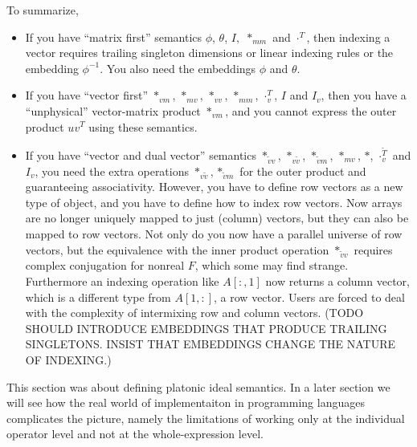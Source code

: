To summarize,
\begin{itemize}
\item If you have ``matrix first'' semantics $\phi$, $\theta$, $I,$
$*_{mm}$ and $\cdot^{T}$, then indexing a vector requires trailing
singleton dimensions or linear indexing rules or the embedding $\phi^{-1}$.
You also need the embeddings $\phi$ and $\theta$.
\item If you have ``vector first'' $*_{vm}$, $*_{mv}$, $*_{vv}$, $*_{mm}$,
$\cdot_{v}^{T}$, $I$ and $I_{v}$, then you have a ``unphysical''
vector-matrix product $*_{vm}$, and you cannot express the outer
product $uv^{T}$ using these semantics.
\item If you have ``vector and dual vector'' semantics $*_{\tilde{v}v}$,
$*_{v\tilde{v}}$, $*_{\tilde{v}m}$, $*_{mv}$, $*$, $\cdot_{v}^{\tilde{T}}$
and $I_{v}$, you need the extra operations $*_{v\tilde{v}},*_{\tilde{v}m}$
for the outer product and guaranteeing associativity. However, you
have to define row vectors as a new type of object, and you have to
define  how to index row vectors. Now arrays are no longer uniquely
mapped to just (column) vectors, but they can also be mapped to row
vectors. Not only do you now have a parallel universe of row vectors,
but the equivalence with the inner product operation $*_{\tilde{v}v}$
requires complex conjugation for nonreal $F$, which some may find
strange. Furthermore an indexing operation like $A[:,1]$ now returns
a column vector, which is a different type from $A[1,:]$, a row vector.
Users are forced to deal with the complexity of intermixing row and
column vectors. (TODO SHOULD INTRODUCE EMBEDDINGS THAT PRODUCE TRAILING
SINGLETONS. INSIST THAT EMBEDDINGS CHANGE THE NATURE OF INDEXING.)
\end{itemize}
This section was about defining platonic ideal semantics. In a later
section we will see how the real world of implementaiton in programming
languages complicates the picture, namely the limitations of working
only at the individual operator level and not at the whole-expression
level.
